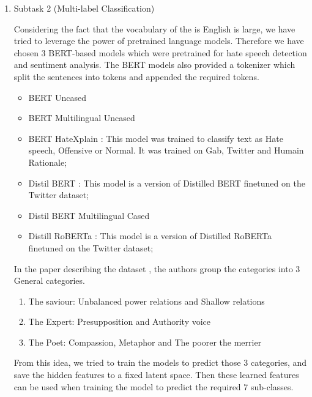 \documentclass[11pt]{article}
\begin{document}
\begin{enumerate}
	\item Subtask 2 (Multi-label Classification)

	      Considering the fact that the vocabulary of the is English is large,
	      we have tried to leverage the power of pretrained language models.
	      Therefore we have chosen 3 BERT-based models which were pretrained
	      for hate speech detection and sentiment analysis. The BERT models
	      also provided a tokenizer which split the sentences into tokens and
	      appended the required tokens.

	      \begin{itemize}
		      \item BERT \cite{bert} Uncased

		      \item  BERT Multilingual Uncased

		      \item BERT HateXplain \cite{mathew2020hatexplain}: This model was trained to classify text as Hate speech, Offensive or Normal.
		            It was trained on Gab, Twitter and Humain Rationale;

		      \item Distil BERT : This model is a version of Distilled BERT finetuned on the Twitter dataset;

		      \item Distil BERT Multilingual Cased \cite{DistilBERT}

		      \item Distill RoBERTa : This model is a version of Distilled RoBERTa finetuned on the Twitter dataset;
	      \end{itemize}

	      In the paper describing the dataset \cite{perezalmendros2020dont},
	      the authors group the categories into 3 General categories.

	      \begin{enumerate}
		      \item The saviour: Unbalanced power relations and Shallow relations

		      \item  The Expert: Presupposition and Authority voice

		      \item The Poet: Compassion, Metaphor and The poorer the merrier

	      \end{enumerate}

	      From this idea, we tried to train the models to predict those 3
	      categories, and save the hidden features to a fixed latent space.
	      Then these learned features can be used when training the model to
	      predict the required 7 sub-classes.


\end{enumerate}
\end{document}
